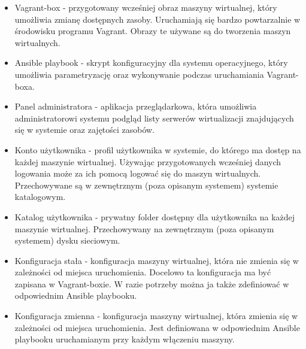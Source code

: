 \documentclass[../wstep.tex]{subfiles}
\begin{document}
\begin{itemize}
    \item Vagrant-box\parencite{vagrantbox} - przygotowany wcześniej obraz maszyny wirtualnej, który umożliwia zmianę dostępnych zasoby. Uruchamiają się bardzo powtarzalnie w środowisku programu Vagrant. Obrazy te używane są do tworzenia maszyn wirtualnych.
    \item Ansible playbook\parencite{ansible-playbook} - skrypt konfiguracyjny dla systemu operacyjnego, który umożliwia parametryzację oraz wykonywanie podczas uruchamiania Vagrant-boxa.
    \item Panel administratora - aplikacja przeglądarkowa, która umożliwia administratorowi systemu podgląd listy serwerów wirtualizacji znajdujących się w systemie oraz zajętości zasobów.
    \item Konto użytkownika - profil użytkownika w systemie, do którego ma dostęp na każdej maszynie wirtualnej. Używając przygotowanych wcześniej danych logowania może za ich pomocą logować się do maszyn wirtualnych. Przechowywane są w zewnętrznym (poza opisanym systemem) systemie katalogowym.
    \item Katalog użytkownika - prywatny folder dostępny dla użytkownika na każdej maszynie wirtualnej. Przechowywany na zewnętrznym (poza opisanym systemem) dysku sieciowym.
    \item Konfiguracja stała - konfiguracja maszyny wirtualnej, która nie zmienia się w zależności od miejsca uruchomienia. Docelowo ta konfiguracja ma być zapisana w Vagrant-boxie. W razie potrzeby można ja także zdefiniować w odpowiednim Ansible playbooku.
    \item Konfiguracja zmienna - konfiguracja maszyny wirtualnej, która zmienia się w zależności od miejsca uruchomienia. Jest definiowana w odpowiednim Ansible playbooku uruchamianym przy każdym włączeniu maszyny.
\end{itemize}
\end{document}
